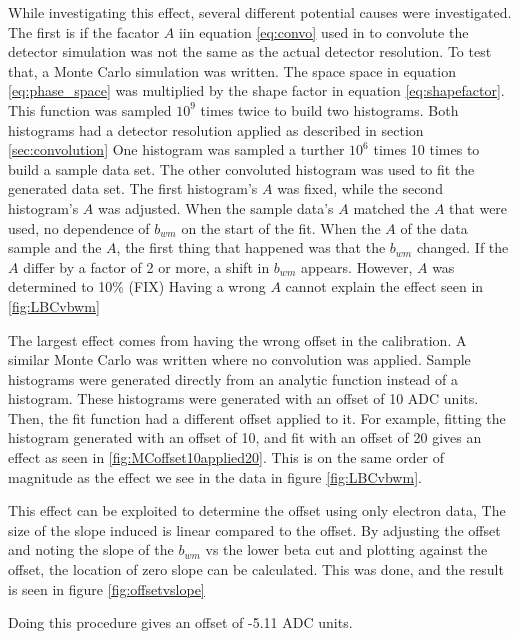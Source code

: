 While investigating this effect, several different potential causes were investigated.
The first is if the facator $A$ iin equation \ref{eq:convo} used in to convolute the detector simulation was not the same as the actual detector resolution.
To test that, a Monte Carlo simulation was written.
The space space in equation \ref{eq:phase_space} was multiplied by the shape factor in equation \ref{eq:shapefactor}.
This function was sampled $10^{9}$ times twice to build two histograms. 
Both histograms had a detector resolution applied as described in section \ref{sec:convolution}
One histogram was sampled a turther $10^{6}$ times 10 times to build a sample data set.
The other convoluted histogram was used to fit the generated data set.
The first histogram's $A$ was fixed, while the second histogram's $A$ was adjusted.
When the sample data's $A$ matched the $A$ that were used, no dependence of $b_{wm}$ on the start of the fit.
When the $A$ of the data sample and the $A$, the first thing that happened was that the $b_{wm}$ changed.
If the $A$ differ by a factor of 2 or more, a shift in $b_{wm}$ appears.
However, $A$ was determined to 10\% (FIX)
Having a wrong $A$ cannot explain the effect seen in \ref{fig:LBCvbwm}

The largest effect comes from having the wrong offset in the calibration.
A similar Monte Carlo was written where no convolution was applied.
Sample histograms were generated directly from an analytic function instead of a histogram.
These histograms were generated with an offset of 10 ADC units.
Then, the fit function had a different offset applied to it.
For example, fitting the histogram generated with an offset of 10, and fit with an offset of 20 gives an effect as seen in \ref{fig:MCoffset10applied20}.
This is on the same order of magnitude as the effect we see in the data in figure \ref{fig:LBCvbwm}.

This effect can be exploited to determine the offset using only electron data, 
The size of the slope induced is linear compared to the offset.
By adjusting the offset and noting the slope of the $b_{wm}$ vs the lower beta cut and plotting against the offset, the location of zero slope can be calculated.
This was done, and the result is seen in figure \ref{fig:offsetvslope} 

Doing this procedure gives an offset of -5.11 ADC units. 

